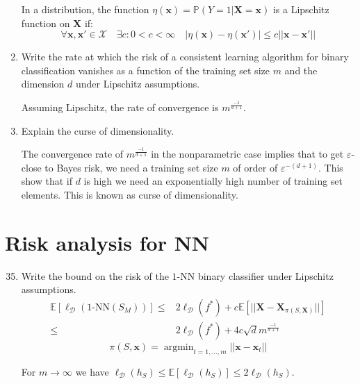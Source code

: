 \documentclass[a4paper]{article}
\newcommand{\X}{\ensuremath{\mathcal{X}}}
\newcommand{\D}{\ensuremath{\mathcal{D}}}
\newcommand{\E}{\ensuremath{\mathbb{E}}}
\newcommand{\Prob}{\ensuremath{\mathbb{P}}}
\DeclareMathOperator*{\argmin}{argmin}
\begin{document}
\begin{enumerate}
        In a distribution, the function $\eta(\bm x)=\Prob(Y=1|\bm X=\bm x)$ is a Lipschitz function
        on $\bm X$ if:
        $$ \forall \bm x,\bm x'\in\X \quad \exists c:0<c<\infty
        \quad |\eta(\bm x)-\eta(\bm x')|\leq c||\bm x-\bm x'|| $$
    \item Write the rate at which the risk of a consistent learning algorithm for binary
        classification vanishes as a function of the training set size $m$ and the dimension
        $d$ under Lipschitz assumptions.

        Assuming Lipschitz, the rate of convergence is $m^{\frac{-1}{d+1}}$.
    \item Explain the curse of dimensionality.
    
        The convergence rate of $m^{\frac{-1}{d+1}}$ in the nonparametric case implies that
        to get $\varepsilon$-close to Bayes risk, we need a training set size $m$ of order of
        $\varepsilon^{-(d+1)}$. This show that if $d$ is high we need an exponentially high
        number of training set elements. This is known as curse of dimensionality.
\end{enumerate}

\section{Risk analysis for NN}
\begin{enumerate}
    \setcounter{enumi}{34}
    \item Write the bound on the risk of the $1$-NN binary classifier under Lipschitz
    assumptions.
    $$ \begin{aligned}
        \E[\ell_\D(1\text{-NN}(S_M))] \leq& 2\ell_\D(f^*)+
        c\E\left[||\bm{X}-\bm{X}_{\pi(S,\bm X)}||\right]\\
        \leq& 2\ell_\D(f^*)+4c\sqrt{d}m^{\frac{-1}{d+1}}
    \end{aligned}$$
    $$ \pi(S,\bm x) = \argmin_{t=1,\dots,m} ||\bm x-\bm x_t|| $$

    For $m\to\infty$ we have $\ell_\D(h_S)\leq\E[\ell_\D(h_S)]\leq2\ell_\D(h_S)$.
\end{enumerate}
\end{document}
